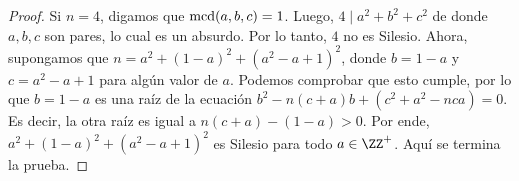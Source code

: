 \begin{proof}
	Si $n=4$, digamos que $\operatorname{mcd}(a,b,c)=1$. Luego, $4\mid a^2+b^2+c^2$ de donde $a,b,c$ son pares, lo cual es un absurdo. Por lo tanto, $4$ no es Silesio. Ahora, supongamos que $n=a^2+(1-a)^2+(a^2-a+1)^2$, donde $b=1-a$ y $c=a^2-a+1$ para algún valor de $a$. Podemos comprobar que esto cumple, por lo que $b=1-a$ es una raíz de la ecuación $b^2-n(c+a)b+(c^2+a^2-nca)=0$. Es decir, la otra raíz es igual a $n(c+a)-(1-a)>0$. Por ende, $a^2+(1-a)^2+(a^2-a+1)^2$ es Silesio para todo $a\in\ZZ^+$. Aquí se termina la prueba.
\end{proof}
